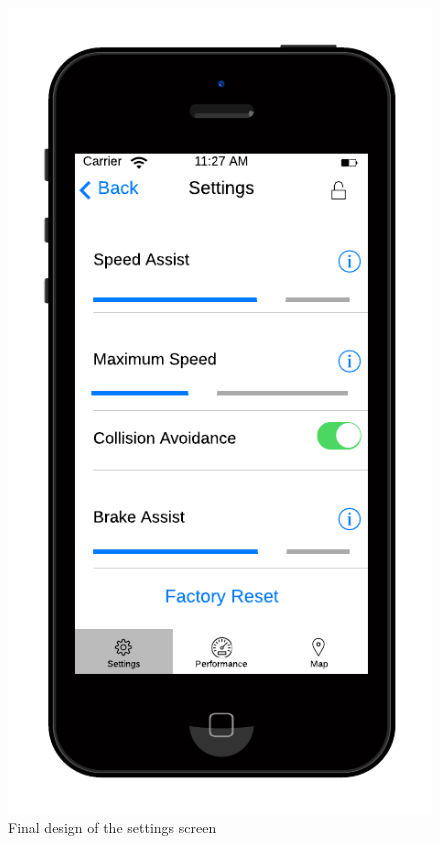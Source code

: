 \documentclass[a4paper]{report}
\begin{document}
\begin{figure}[h]
\centering
\includegraphics[scale=0.6]{figures/final_design/settings}
\caption{Final design of the settings screen}
\end{figure}
\end{document}

